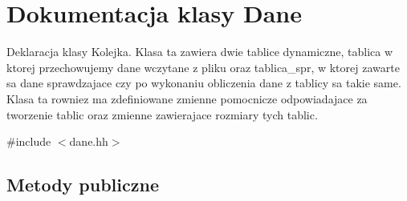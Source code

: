 \hypertarget{class_dane}{\section{\-Dokumentacja klasy \-Dane}
\label{class_dane}
}


\-Deklaracja klasy \-Kolejka. \-Klasa ta zawiera dwie tablice dynamiczne, tablica w ktorej przechowujemy dane wczytane z pliku oraz tablica\-\_\-spr, w ktorej zawarte sa dane sprawdzajace czy po wykonaniu obliczenia dane z tablicy sa takie same. \-Klasa ta rowniez ma zdefiniowane zmienne pomocnicze odpowiadajace za tworzenie tablic oraz zmienne zawierajace rozmiary tych tablic.  




{\ttfamily \#include $<$dane.\-hh$>$}

\subsection*{\-Metody publiczne}
